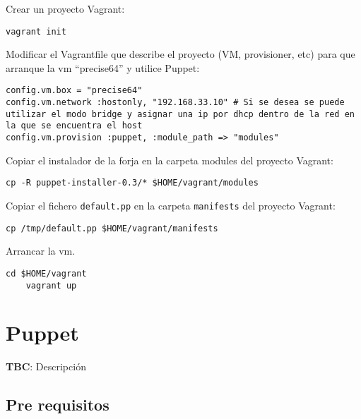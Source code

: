\par Crear un proyecto Vagrant:

\lstset{style=rubybasico}
\begin{lstlisting}[frame=trbl]
    vagrant init
\end{lstlisting}

\par Modificar el Vagrantfile que describe el proyecto (VM, provisioner, etc) para que arranque la vm ``precise64'' y utilice Puppet:

\lstset{style=rubybasico}
\begin{lstlisting}[frame=trbl]
config.vm.box = "precise64"
config.vm.network :hostonly, "192.168.33.10" # Si se desea se puede utilizar el modo bridge y asignar una ip por dhcp dentro de la red en la que se encuentra el host
config.vm.provision :puppet, :module_path => "modules"

\end{lstlisting}

\par Copiar el instalador de la forja en la carpeta modules del proyecto Vagrant:

\lstset{style=rubybasico}
\begin{lstlisting}[frame=trbl]
    cp -R puppet-installer-0.3/* $HOME/vagrant/modules
\end{lstlisting}

\par Copiar el fichero \texttt{default.pp} en la carpeta \texttt{manifests} del proyecto Vagrant:

\lstset{style=rubybasico}
\begin{lstlisting}[frame=trbl]
    cp /tmp/default.pp $HOME/vagrant/manifests
\end{lstlisting}

\par Arrancar la vm.

\lstset{style=rubybasico}
\begin{lstlisting}[frame=trbl]
    cd $HOME/vagrant
    vagrant up
\end{lstlisting}

\section{Puppet}
\label{puppet}

\textbf{TBC}: Descripción

\subsection{Pre requisitos}
\label{sub:puppet-pre-requisitos}

